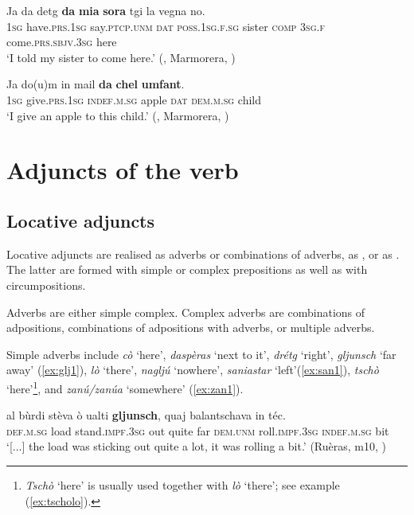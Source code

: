 \ea\label{ex:marm1}
\gll  Ja da detg \textbf{da} \textbf{mia} \textbf{sora} tgi la vegna no.\\
\textsc{1sg} have.\textsc{prs.1sg} say.\textsc{ptcp.unm} \textsc{dat} \textsc{poss.1sg.f.sg} sister \textsc{comp} \textsc{3sg.f} come.\textsc{prs.sbjv.3sg} here\\
\glt `I told my sister to come here.' (, Marmorera, )
\z

\ea\label{ex:marm2}
\gll  Ja do(u)m in mail \textbf{da} \textbf{chel} \textbf{umfant}.\\
\textsc{1sg} give.\textsc{prs.1sg} \textsc{indef.m.sg} apple \textsc{dat} \textsc{dem.m.sg} child\\
\glt `I give an apple to this child.' (, Marmorera, )
\z

\section{Adjuncts of the verb}\label{sec:4.3}

\subsection{Locative adjuncts}\label{sec:4.3.1}
Locative adjuncts are realised as adverbs or combinations of adverbs, as , or as . The latter are formed with simple or complex prepositions as well as with circumpositions.

Adverbs are either simple complex. Complex adverbs are combinations of adpositions, combinations of adpositions with adverbs, or multiple adverbs.

Simple adverbs include \textit{cò} `here', \textit{daspèras} `next to it', \textit{drétg} `right', \textit{gljunsch} `far away' (\ref{ex:glj1}), \textit{lò} `there', \textit{nagljú} `nowhere',  \textit{saniastar} `left'(\ref{ex:san1}), \textit{tschò} `here'\footnote{\textit{Tschò} `here' is usually used together with \textit{lò} `there'; see example (\ref{ex:tscholo}).}, and \textit{zanú/zanúa} `somewhere' (\ref{ex:zan1}).

\ea
\label{ex:glj1}
\gll  [...] al bùrdi stèva ò ualti \textbf{gljunsch}, quaj balantschava in téc.\\
{} \textsc{def.m.sg} load  stand.\textsc{impf.3sg} out quite far \textsc{dem.unm} roll.\textsc{impf.3sg}  \textsc{indef.m.sg} bit\\
\glt `[...] the load was sticking out quite a lot, it was rolling a bit.' (Ruèras, m10, )
\z


